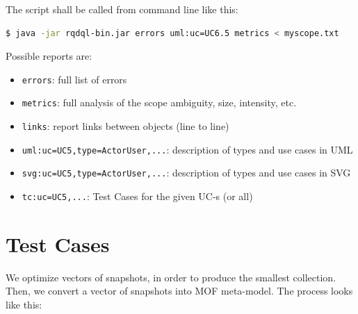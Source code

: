 \documentclass[12pt,oneside,letterpaper]{article}
\begin{document}
    The script shall be called from command line like this:

    \begin{lstlisting}[language=bash]
$ java -jar rqdql-bin.jar errors uml:uc=UC6.5 metrics < myscope.txt
    \end{lstlisting}

    Possible reports are:

    \begin{itemize}
        \item \texttt{errors}: full list of errors
        \item \texttt{metrics}: full analysis of the scope ambiguity, size, intensity, etc.
        \item \texttt{links}: report links between objects (line to line)
        \item \texttt{uml:uc=UC5,type=ActorUser,...}: description of types and use cases in UML
        \item \texttt{svg:uc=UC5,type=ActorUser,...}: description of types and use cases in SVG
        \item \texttt{tc:uc=UC5,...}: Test Cases for the given UC-s (or all)
    \end{itemize}





\section{Test Cases}
\label{sec:test-cases}

    We optimize vectors of snapshots, in order
    to produce the smallest collection.
    Then, we convert a vector of snapshots into MOF meta-model.
    The process looks like this:

\end{document}
